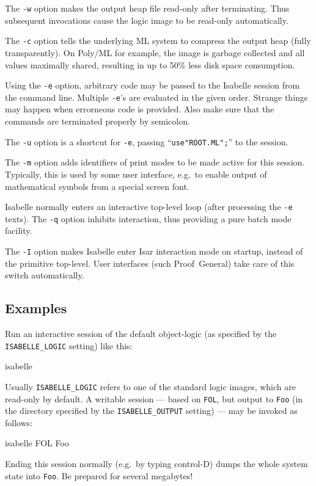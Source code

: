 \medskip The \texttt{-w} option makes the output heap file read-only after
terminating.  Thus subsequent invocations cause the logic image to be
read-only automatically.

\medskip The \texttt{-c} option tells the underlying ML system to compress the
output heap (fully transparently).  On Poly/ML for example, the image is
garbage collected and all values maximally shared, resulting in up to 50\%
less disk space consumption.

\medskip Using the \texttt{-e} option, arbitrary {\ML} code may be passed to
the Isabelle session from the command line. Multiple \texttt{-e}'s are
evaluated in the given order. Strange things may happen when errorneous {\ML}
code is provided. Also make sure that the {\ML} commands are terminated
properly by semicolon.

\medskip The \texttt{-u} option is a shortcut for \texttt{-e}, passing
``\texttt{use"ROOT.ML";}'' to the {\ML} session.

\medskip The \texttt{-m} option adds identifiers of print modes to be made
active for this session. Typically, this is used by some user interface, e.g.\ 
to enable output of mathematical symbols from a special screen font.

\medskip Isabelle normally enters an interactive top-level loop (after
processing the \texttt{-e} texts). The \texttt{-q} option inhibits
interaction, thus providing a pure batch mode facility.

\medskip The \texttt{-I} option makes Isabelle enter Isar interaction mode on
startup, instead of the primitive {\ML} top-level.  User interfaces (such
Proof~General) take care of this switch automatically.


\subsection*{Examples}

Run an interactive session of the default object-logic (as specified
by the \texttt{ISABELLE_LOGIC} setting) like this:
\begin{ttbox}
isabelle
\end{ttbox}
Usually \texttt{ISABELLE_LOGIC} refers to one of the standard logic
images, which are read-only by default.  A writable session --- based
on \texttt{FOL}, but output to \texttt{Foo} (in the directory
specified by the \texttt{ISABELLE_OUTPUT} setting) --- may be invoked
as follows:
\begin{ttbox}
isabelle FOL Foo
\end{ttbox}
Ending this session normally (e.g.\ by typing control-D) dumps the
whole {\ML} system state into \texttt{Foo}. Be prepared for several
megabytes!

